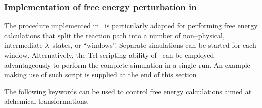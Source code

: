 \subsubsection{Implementation of free energy perturbation in \NAMD}


The procedure implemented in \NAMD\ is particularly
adapted for performing free 
energy calculations that split the reaction path into a number of non--physical,
intermediate $\lambda$--states, or ``windows''. Separate simulations 
can be started for each window.
Alternatively, the {\sc Tcl} scripting ability of 
\NAMD\ can be employed advantageously
to perform the complete simulation in a single run.
An example making use of such script is supplied at the end 
of this section.


The following keywords can be used to control free 
energy calculations aimed at alchemical transformations. 

